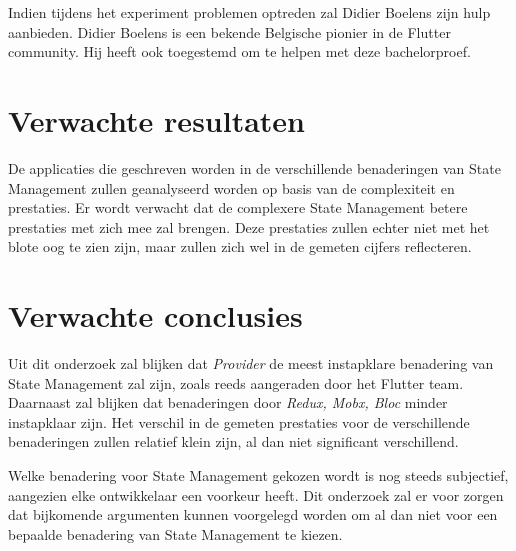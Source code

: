 Indien tijdens het experiment problemen optreden zal Didier Boelens zijn hulp aanbieden.
Didier Boelens is een bekende Belgische pionier in de Flutter community. Hij heeft ook toegestemd om te helpen met deze bachelorproef.

%

\section{Verwachte resultaten}
\label{sec:verwachte_resultaten}

De applicaties die geschreven worden in de verschillende benaderingen van State Management zullen
geanalyseerd worden op basis van de complexiteit en prestaties.
Er wordt verwacht dat de complexere State Management betere prestaties met zich mee zal brengen.
Deze prestaties zullen echter niet met het blote oog te zien zijn, maar zullen zich wel in de 
gemeten cijfers reflecteren.


\section{Verwachte conclusies}
\label{sec:verwachte_conclusies}
Uit dit onderzoek zal blijken dat \emph{Provider} de meest instapklare benadering van State Management
zal zijn, zoals reeds aangeraden door het Flutter team.
Daarnaast zal blijken dat benaderingen door \emph{Redux, Mobx, Bloc} minder instapklaar zijn.
Het verschil in de gemeten prestaties voor de verschillende benaderingen zullen relatief klein zijn, al dan niet significant verschillend.

Welke benadering voor State Management gekozen wordt is nog steeds subjectief, aangezien elke ontwikkelaar een voorkeur heeft. Dit onderzoek zal er voor zorgen
dat bijkomende argumenten kunnen voorgelegd worden om al dan niet voor een bepaalde benadering van State Management te kiezen.



